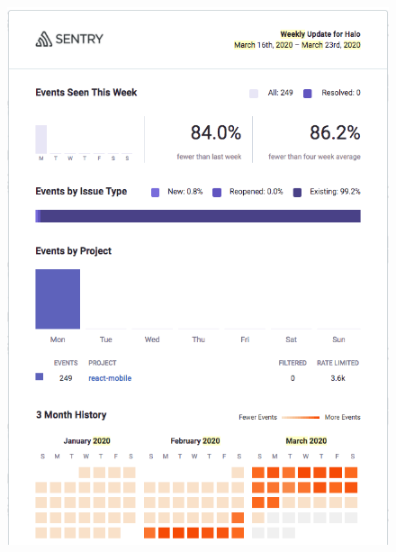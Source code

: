 \begin{figure}[htbp!]
\centering
\begin{minipage}{.45\textwidth}
  \centering
  \includegraphics[width=\textwidth]{images/localhalo/sentry-weekly-report-16-mar-2020.png}
  \label{fig:localhalo-sentry-weekly-report-16-mar-2020}
\end{minipage}\hfill%
\begin{minipage}{.45\textwidth}
  \centering

\end{minipage}
\end{figure}
